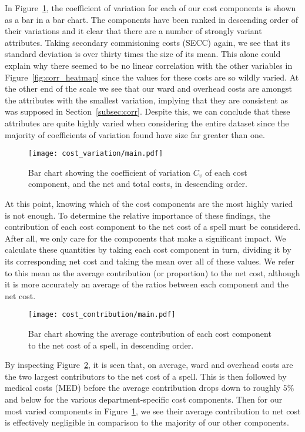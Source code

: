 In Figure~\ref{fig:cost_variation}, the coefficient of variation for each of our
cost components is shown as a bar in a bar chart. The components have been
ranked in descending order of their variations and it clear that there are a
number of strongly variant attributes. Taking secondary commisioning costs
(SECC) again, we see that its standard deviation is over thirty times the size
of its mean. This alone could explain why there seemed to be no linear
correlation with the other variables in Figure~\ref{fig:corr_heatmap} since the
values for these costs are so wildly varied. At the other end of the scale we
see that our ward and overhead costs are amongst the attributes with the
smallest variation, implying that they are consistent as was supposed in
Section~\ref{subsec:corr}. Despite this, we can conclude that these attributes
are quite highly varied when considering the entire dataset since the majority
of coefficients of variation found have size far greater than one.

\begin{figure}[h]
    \centering
    \texttt{[image: cost\_variation/main.pdf]}
    \caption{Bar chart showing the coefficient of variation \(C_{v}\) of each
        cost component, and the net and total costs, in descending
        order.}\label{fig:cost_variation}
\end{figure}

At this point, knowing which of the cost components are the most highly varied
is not enough. To determine the relative importance of these findings, the
contribution of each cost component to the net cost of a spell must be
considered. After all, we only care for the components that make a significant
impact. We calculate these quantities by taking each cost component in turn,
dividing it by its corresponding net cost and taking the mean over all of these
values. We refer to this mean as the average contribution (or proportion) to the
net cost, although it is more accurately an average of the ratios between each
component and the net cost.

\begin{figure}[h]
    \centering
    \texttt{[image: cost\_contribution/main.pdf]}
    \caption{Bar chart showing the average contribution of each cost component
        to the net cost of a spell, in descending
        order.}\label{fig:cost_contribution}
\end{figure}

By inspecting Figure~\ref{fig:cost_contribution}, it is seen that, on average,
ward and overhead costs are the two largest contributors to the net cost of a
spell. This is then followed by medical costs (MED) before the average
contribution drops down to roughly \(5\%\) and below for the various
department-specific cost components. Then for our most varied components in
Figure~\ref{fig:cost_variation}, we see their average contribution to net cost
is effectively negligible in comparison to the majority of our other components.

